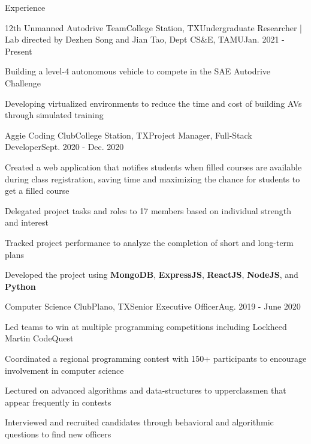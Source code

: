 \documentclass{resume} %
\begin{document}
\begin{rSection}{Experience}
    \begin{rSubsection}{12th Unmanned Autodrive Team}{College Station, TX}{Undergraduate Researcher | Lab directed by Dezhen Song and Jian Tao, Dept CS\&E, TAMU}{Jan. 2021 - Present}
    \item Building a level-4 autonomous vehicle to compete in the SAE Autodrive Challenge
    \item Developing virtualized environments to reduce the time and cost of building AVs through simulated training %
\end{rSubsection}

\begin{rSubsection}{Aggie Coding Club}{College Station, TX}{Project Manager, Full-Stack Developer}{Sept. 2020 - Dec. 2020}
    \item Created a web application that notifies students when filled courses are available during class registration, saving time and maximizing the chance for students to get a filled course
    \item Delegated project tasks and roles to 17 members based on individual strength and interest
    \item Tracked project performance to analyze the completion of short and long-term plans
    \item Developed the project using \textbf{MongoDB}, \textbf{ExpressJS}, \textbf{ReactJS}, \textbf{NodeJS}, and \textbf{Python}
\end{rSubsection}

\begin{rSubsection}{Computer Science Club}{Plano, TX}{Senior Executive Officer}{Aug. 2019 - June 2020}
    \item Led teams to win at multiple programming competitions including Lockheed Martin CodeQuest
    \item Coordinated a regional programming contest with 150+ participants to encourage involvement in computer science
    \item Lectured on advanced algorithms and data-structures to upperclassmen that appear frequently in contests
    \item Interviewed and recruited candidates through behavioral and algorithmic questions to find new officers
\end{rSubsection}
\end{rSection}
\end{document}
